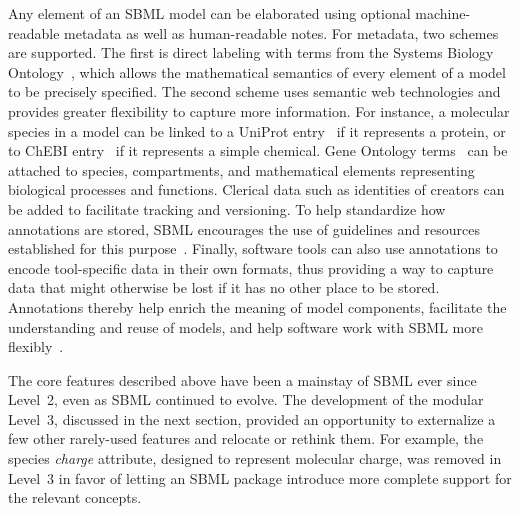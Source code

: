 \documentclass{sbml-paper}
\begin{document}
Any element of an SBML model can be elaborated using optional machine-readable metadata as well as human-readable notes.  For metadata, two schemes are supported.  The first is direct labeling with terms from the Systems Biology Ontology~\citep[SBO;][]{courtot2011controlled}, which allows the mathematical semantics of every element of a model to be precisely specified.  The second scheme uses semantic web technologies and provides greater flexibility to capture more information.  For instance, a molecular species in a model can be linked to a UniProt entry~\citep{uniprot2017} if it represents a protein, or to ChEBI entry~\citep{hastings2013chebi} if it represents a simple chemical.  Gene Ontology terms~\citep[GO;][]{ashburner2000gene} can be attached to species, compartments, and mathematical elements representing biological processes and functions.  Clerical data such as identities of creators can be added to facilitate tracking and versioning.  To help standardize how annotations are stored, SBML encourages the use of guidelines and resources established for this purpose~\citep{le_novere_2005, Laibe2007miriam, Juty2012identifiers}.  Finally, software tools can also use annotations to encode tool-specific data in their own formats, thus providing a way to capture data that might otherwise be lost if it has no other place to be stored.  Annotations thereby help enrich the meaning of model components, facilitate the understanding and reuse of models, and help software work with SBML more flexibly~\citep{krause2011chapter, schulz2011retrieval, Lister2010annotation, Schulz2012propagating, Swainston2009libannotationsbml}.

The core features described above have been a mainstay of SBML ever since Level~2, even as SBML continued to evolve.  The development of the modular Level~3, discussed in the next section, provided an opportunity to externalize a few other rarely-used features and relocate or rethink them.  For example, the species \emph{charge} attribute, designed to represent molecular charge, was removed in Level~3 in favor of letting an SBML package introduce more complete support for the relevant concepts.
\end{document}
